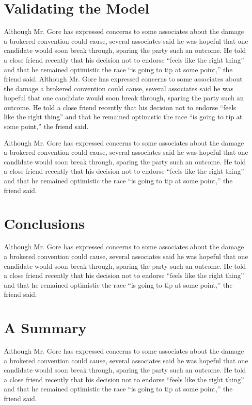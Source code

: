 \section{Validating the Model}%
Although Mr. Gore has expressed concerns to some associates about
the damage a brokered convention could cause, several associates
said he was hopeful that one candidate would soon break through,
sparing the party such an outcome. He told a close friend recently
that his decision not to endorse ``feels like the right thing''
and that he remained optimistic the race ``is going to tip at some
point,'' the friend said. Although Mr. Gore has expressed concerns
to some associates about the damage a brokered convention could
cause, several associates said he was hopeful that one candidate
would soon break through, sparing the party such an outcome. He
told a close friend recently that his decision not to endorse
``feels like the right thing'' and that he remained optimistic the
race ``is going to tip at some point,'' the friend said.


Although Mr. Gore has expressed concerns to some associates about
the damage a brokered convention could cause, several associates
said he was hopeful that one candidate would soon break through,
sparing the party such an outcome. He told a close friend recently
that his decision not to endorse ``feels like the right thing''
and that he remained optimistic the race ``is going to tip at some
point,'' the friend said.

\section{Conclusions}
Although Mr. Gore has expressed concerns to some associates about
the damage a brokered convention could cause, several associates
said he was hopeful that one candidate would soon break through,
sparing the party such an outcome. He told a close friend recently
that his decision not to endorse ``feels like the right thing''
and that he remained optimistic the race ``is going to tip at some
point,'' the friend said.
\section{A Summary    }
Although Mr. Gore has expressed concerns to some associates about
the damage a brokered convention could cause, several associates
said he was hopeful that one candidate would soon break through,
sparing the party such an outcome. He told a close friend recently
that his decision not to endorse ``feels like the right thing''
and that he remained optimistic the race ``is going to tip at some
point,'' the friend said.
